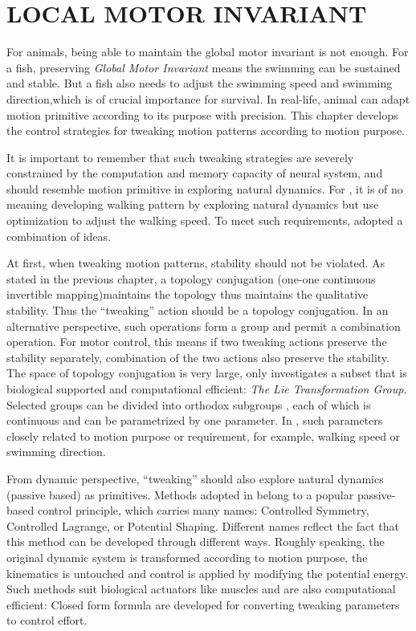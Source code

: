 \chapter{LOCAL MOTOR INVARIANT}
\label{chap:li}

\graphicspath{{LocalInvariant/LocalInvariantFigs/EPS/}{LocalInvariant/LocalInvariantFigs/}}
For animals,  being able to maintain the global motor invariant is not enough.
For a fish, preserving \emph{Global Motor Invariant}  means the swimming can be sustained and stable.
But a fish also needs to adjust the swimming speed and swimming direction,which is of crucial importance for survival.
In real-life, animal can adapt motion primitive according to its purpose with precision.
This chapter develops the control strategies for tweaking motion patterns according to motion purpose.

It is important to remember that such tweaking strategies are severely constrained by the computation and memory capacity of neural system,  and should resemble  motion primitive in exploring natural dynamics.
For \cms, it is of no meaning developing walking pattern by exploring natural dynamics but use optimization to adjust the walking speed. To meet such requirements, \moit adopted a combination of ideas.

At first, when tweaking motion patterns, stability should not be violated. 
As stated in the previous chapter, a topology conjugation (one-one continuous invertible mapping)maintains the topology thus maintains the qualitative stability. Thus the ``tweaking'' action should be a topology conjugation. In an alternative perspective, such operations form a group and permit a combination operation. 
For motor control, this means if two tweaking actions preserve the stability separately, combination of the two actions also preserve the stability.
The space of topology conjugation is very large, \moit only investigates a subset that is biological supported and computational efficient: \emph{The Lie Transformation Group}.
Selected groups can be divided into orthodox subgroups , each of which is continuous and can be parametrized by one parameter.
In \cms, such parameters closely related to motion purpose or requirement, for example, walking speed or swimming direction.

From dynamic perspective, ``tweaking''  should also explore natural dynamics (passive based) as primitives.
Methods adopted in \moit belong to  a popular passive-based control principle, which carries many names: Controlled Symmetry, Controlled Lagrange, or Potential Shaping.
Different names reflect the fact that this method can be developed through different ways.
Roughly speaking, the original dynamic system is transformed according to motion purpose, the kinematics is untouched and control is applied by modifying the potential energy.
Such methods suit biological actuators like muscles and are also computational efficient:
Closed form formula are developed for converting tweaking parameters to control effort.

